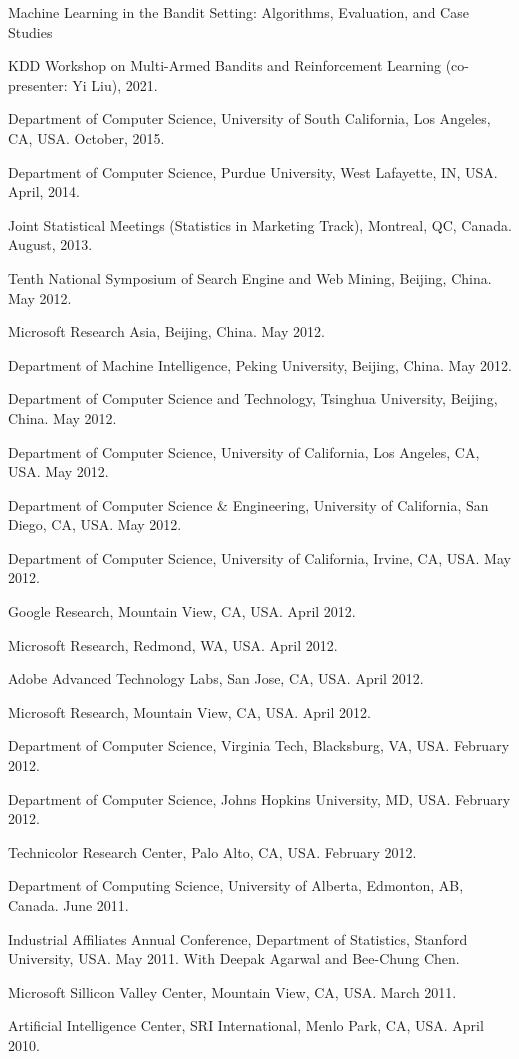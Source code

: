 \documentclass[10pt,twoside,letterpaper]{article}
\newcommand{\negitemspace}{\vspace{1mm}}
\begin{document}
\begin{compactitem}
\item{Machine Learning in the Bandit Setting: Algorithms, Evaluation, and Case Studies}
\begin{compactitem}
\item{KDD Workshop on Multi-Armed Bandits and Reinforcement Learning (co-presenter: Yi Liu), 2021.}
\item{Department of Computer Science, University of South California, Los Angeles, CA, USA. October, 2015.}
\item{Department of Computer Science, Purdue University, West Lafayette, IN, USA. April, 2014.}
\item{Joint Statistical Meetings (Statistics in Marketing Track), Montreal, QC, Canada.  August, 2013.}
\item{Tenth National Symposium of Search Engine and Web Mining, Beijing, China.  May 2012.}
\item{Microsoft Research Asia, Beijing, China.  May 2012.}
\item{Department of Machine Intelligence, Peking University, Beijing, China.  May 2012.}
\item{Department of Computer Science and Technology, Tsinghua University, Beijing, China.  May 2012.}
\item{Department of Computer Science, University of California, Los Angeles, CA, USA.  May 2012.}
\item{Department of Computer Science \& Engineering, University of California, San Diego, CA, USA.  May 2012.}
\item{Department of Computer Science, University of California, Irvine, CA, USA.  May 2012.}
\item{Google Research, Mountain View, CA, USA. April 2012.}
\item{Microsoft Research, Redmond, WA, USA. April 2012.}
\item{Adobe Advanced Technology Labs, San Jose, CA, USA.  April 2012.}
\item{Microsoft Research, Mountain View, CA, USA. April 2012.}
\item{Department of Computer Science, Virginia Tech, Blacksburg, VA, USA.  February 2012.}
\item{Department of Computer Science, Johns Hopkins University, MD, USA.  February 2012.}
\item{Technicolor Research Center, Palo Alto, CA, USA.  February 2012.}
\item{Department of Computing Science, University of Alberta, Edmonton, AB, Canada. June 2011.}
\item{Industrial Affiliates Annual Conference, Department of Statistics, Stanford University, USA.  May 2011.  With Deepak Agarwal and Bee-Chung Chen.}
\item{Microsoft Sillicon Valley Center, Mountain View, CA, USA.  March 2011.}
\item{Artificial Intelligence Center, SRI International, Menlo Park, CA, USA.  April 2010.}
\end{compactitem} \negitemspace


\end{compactitem}
\end{document}

